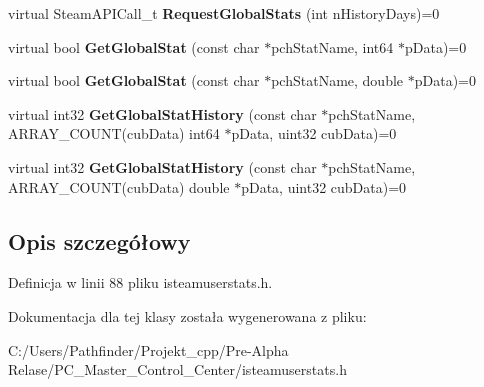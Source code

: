 \begin{DoxyCompactItemize}
virtual Steam\+A\+P\+I\+Call\+\_\+t {\bfseries Request\+Global\+Stats} (int n\+History\+Days)=0
\item 
\mbox{\label{class_i_steam_user_stats_a0227aabee90c830b9e7cdce7fc27dd60}} 
virtual bool {\bfseries Get\+Global\+Stat} (const char $\ast$pch\+Stat\+Name, int64 $\ast$p\+Data)=0
\item 
\mbox{\label{class_i_steam_user_stats_a45f8d4102d8bafa1ce12953eb28f58cc}} 
virtual bool {\bfseries Get\+Global\+Stat} (const char $\ast$pch\+Stat\+Name, double $\ast$p\+Data)=0
\item 
\mbox{\label{class_i_steam_user_stats_aaccd1cadd574fc89542f6f84e7794a3d}} 
virtual int32 {\bfseries Get\+Global\+Stat\+History} (const char $\ast$pch\+Stat\+Name, A\+R\+R\+A\+Y\+\_\+\+C\+O\+U\+NT(cub\+Data) int64 $\ast$p\+Data, uint32 cub\+Data)=0
\item 
\mbox{\label{class_i_steam_user_stats_ac2b6f77ebc841f39624c097f811f4aae}} 
virtual int32 {\bfseries Get\+Global\+Stat\+History} (const char $\ast$pch\+Stat\+Name, A\+R\+R\+A\+Y\+\_\+\+C\+O\+U\+NT(cub\+Data) double $\ast$p\+Data, uint32 cub\+Data)=0
\end{DoxyCompactItemize}


\subsection{Opis szczegółowy}


Definicja w linii 88 pliku isteamuserstats.\+h.



Dokumentacja dla tej klasy została wygenerowana z pliku\+:\begin{DoxyCompactItemize}
\item 
C\+:/\+Users/\+Pathfinder/\+Projekt\+\_\+cpp/\+Pre-\/\+Alpha Relase/\+P\+C\+\_\+\+Master\+\_\+\+Control\+\_\+\+Center/isteamuserstats.\+h\end{DoxyCompactItemize}
